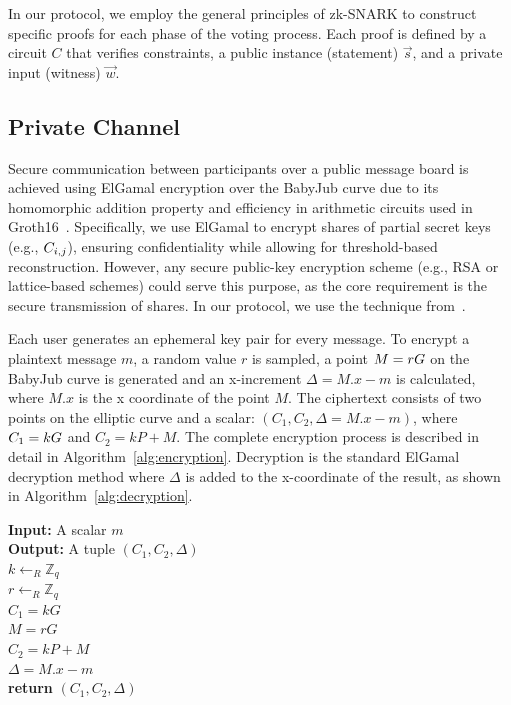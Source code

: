 \documentclass[lettersize,journal]{IEEEtran}
\theoremstyle{definition}
\begin{document}
In our protocol, we employ the general principles of zk-SNARK to construct specific proofs for each phase of the voting process. Each proof is defined by a circuit $C$ that verifies constraints, a public instance (statement) $\vec{s}$, and a private input (witness) $\vec{w}$.

\subsection{Private Channel}\label{private-channel}
Secure communication between participants over a public message board is achieved using ElGamal encryption over the BabyJub curve due to its homomorphic addition property and efficiency in arithmetic circuits used in Groth16~\cite{grothSizePairingBasedNoninteractive2016}. Specifically, we use ElGamal to encrypt shares of partial secret keys (e.g., \(C_{i,j}\)), ensuring confidentiality while allowing for threshold-based reconstruction. However, any secure public-key encryption scheme (e.g., RSA or lattice-based schemes) could serve this purpose, as the core requirement is the secure transmission of shares.  In our protocol, we use the technique from~\cite{ElGamalEncryptionDecryption2020,jieWeijiekohElgamalbabyjub2023}. 

Each user generates an ephemeral key pair for every message. To encrypt a plaintext message $m$, a random value $r$ is sampled, a point $M=rG$ on the BabyJub curve is generated and an x-increment $\Delta = M.x - m$ is calculated, where $M.x$ is the x coordinate of the point $M$. The ciphertext consists of two points on the elliptic curve and a scalar: $(C_1, C_2, \Delta=M.x - m)$, where $C_1=kG$ and $C_2=kP+M$. The complete encryption process is described in detail in Algorithm~\ref{alg:encryption}. Decryption is the standard ElGamal decryption method where $\Delta$ is added to the x-coordinate of the result, as shown in Algorithm~\ref{alg:decryption}.

\begin{algorithm}[h!]
    \caption{$\texttt{Enc}_{P_i}$}
    \label{alg:encryption}
    \textbf{Input:} A scalar $m$\\
    \textbf{Output:} A tuple $(C_1, C_2, \Delta)$\\
    $k \gets_R \mathbb{Z}_q$\\
    $r \gets_R \mathbb{Z}_q$\\
    $C_1 = kG$\\
    $M = rG$\\
    $C_2 = kP + M$\\
    $\Delta = M.x - m$\\
    \textbf{return} $(C_1, C_2, \Delta)$
\end{algorithm}
\end{document}
